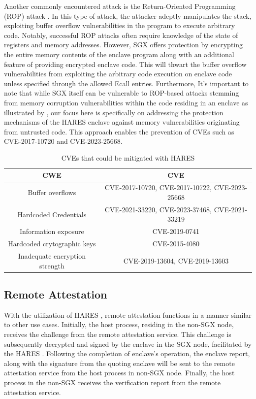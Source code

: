 \documentclass[article, doublespace,nopageskip]{VTthesis} %
\newcommand{\monitor}{HARES }
\begin{document}
    Another commonly encountered attack is the Return-Oriented Programming (ROP) attack \cite{Remote-procedure-call}. In this type of attack, the attacker adeptly manipulates the stack, exploiting buffer overflow vulnerabilities in the program to execute arbitrary code. Notably, successful ROP attacks often require knowledge of the state of registers and memory addresses. However, SGX offers protection by encrypting the entire memory contents of the enclave program along with an additional feature of providing encrypted enclave code. This will thwart the buffer overflow vulnerabilities from exploiting the arbitrary code execution on enclave code unless specified through the allowed Ecall entries. Furthermore, It's important to note that while SGX itself can be vulnerable to ROP-based attacks stemming from memory corruption vulnerabilities within the code residing in an enclave as illustrated by \cite{ROP-paper}, our focus here is specifically on addressing the protection mechanisms of the \monitor enclave against memory vulnerabilities originating from untrusted code. This approach enables the prevention of CVEs such as CVE-2017-10720 and CVE-2023-25668.

    \begin{table}[t]
    \centering
    \footnotesize
    \caption{CVEs that could be mitigated with \monitor}
    \begin{tabular}{| c | c |} \hline
          CWE & CVE \\ \hline \hline
        Buffer overflows & CVE-2017-10720, CVE-2017-10722, CVE-2023-25668\\ \hline  
        Hardcoded Credentials & CVE-2021-33220, CVE-2023-37468, CVE-2021-33219\\ \hline
        Information exposure & CVE-2019-0741 \\ \hline
        Hardcoded crytographic keys & CVE-2015-4080 \\ \hline
        Inadequate encryption strength & CVE-2019-13604, CVE-2019-13603 \\ \hline
    \end{tabular}
    \label{t:CVEs}
    \end{table}

    \subsection{Remote Attestation}
    With the utilization of \monitor, remote attestation functions in a manner similar to other use cases. Initially, the host process, residing in the non-SGX node, receives the challenge from the remote attestation service. This challenge is subsequently decrypted and signed by the enclave in the SGX node, facilitated by the \monitor. Following the completion of enclave’s operation, the enclave report, along with the signature from the quoting enclave will be sent to the remote attestation service from the host process in non-SGX node. Finally, the host process in the non-SGX receives the verification report from the remote attestation service.
\end{document}
